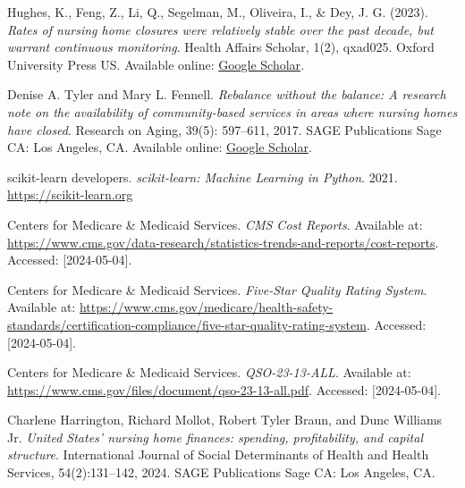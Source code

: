 \documentclass{article}
\theoremstyle{mytheoremstyle}
\theoremstyle{mytheoremstyle}
\theoremstyle{myproblemstyle}
\begin{document}
\begin{thebibliography}{9}

Hughes, K., Feng, Z., Li, Q., Segelman, M., Oliveira, I., \& Dey, J. G. (2023).
\textit{Rates of nursing home closures were relatively stable over the past decade, but warrant continuous monitoring}.
Health Affairs Scholar, 1(2), qxad025. Oxford University Press US. Available online: \href{https://scholar.google.com/scholar_lookup?journal=Heal+Aff+Sch&title=Rates+of+nursing+home+closures+were+relatively+stable+over+the+past+decade,+but+warrant+continuous+monitoring&author=K+Hughes&author=Z+Feng&author=Q+Li&volume=1&issue=2&publication_year=2023&d=gs_cit&t=1714807740518&u=%2Fscholar%3Fq%3Dinfo%3AT6cB2hNX4sgJ%3Ascholar.google.com%2F%26output%3Dcite%26scirp%3D0%26hl%3Den}{Google Scholar}.

Denise A. Tyler and Mary L. Fennell.
\textit{Rebalance without the balance: A research note on the availability of community-based services in areas where nursing homes have closed}.
Research on Aging, 39(5): 597--611, 2017.
SAGE Publications Sage CA: Los Angeles, CA. Available online: \href{https://scholar.google.com/scholar_lookup?journal=Heal+Aff+Sch&title=Rates+of+nursing+home+closures+were+relatively+stable+over+the+past+decade,+but+warrant+continuous+monitoring&author=K+Hughes&author=Z+Feng&author=Q+Li&volume=1&issue=2&publication_year=2023&}{Google Scholar}.

scikit-learn developers. 
\textit{scikit-learn: Machine Learning in Python}. 
2021. 
\url{https://scikit-learn.org}

Centers for Medicare \& Medicaid Services.
\textit{CMS Cost Reports}. 
Available at: \url{https://www.cms.gov/data-research/statistics-trends-and-reports/cost-reports}.
Accessed: [2024-05-04].

Centers for Medicare \& Medicaid Services.
\textit{Five-Star Quality Rating System}. 
Available at: \url{https://www.cms.gov/medicare/health-safety-standards/certification-compliance/five-star-quality-rating-system}.
Accessed: [2024-05-04].

Centers for Medicare \& Medicaid Services.
\textit{QSO-23-13-ALL}. 
Available at: \url{https://www.cms.gov/files/document/qso-23-13-all.pdf}.
Accessed: [2024-05-04].

Charlene Harrington, Richard Mollot, Robert Tyler Braun, and Dunc Williams Jr.
\textit{United States' nursing home finances: spending, profitability, and capital structure}.
International Journal of Social Determinants of Health and Health Services, 54(2):131--142, 2024.
SAGE Publications Sage CA: Los Angeles, CA.


\end{thebibliography}
\end{document}
